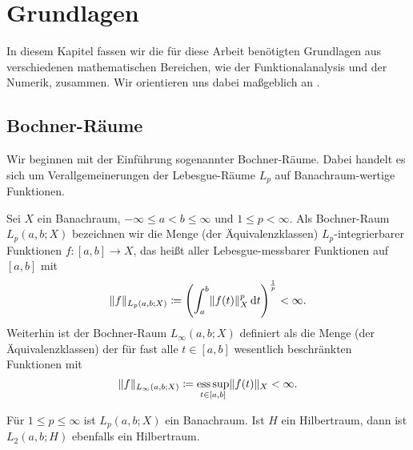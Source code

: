 
\chapter{Grundlagen} %
\label{cha:grundlagen}

In diesem Kapitel fassen wir die für diese Arbeit benötigten Grundlagen aus verschiedenen mathematischen Bereichen, wie der Funktionalanalysis und der Numerik, zusammen.
Wir orientieren uns dabei maßgeblich an \cite{Dautray:1992by}.

\section{Bochner-Räume} %
\label{sec:bochner_r_ume}

Wir beginnen mit der Einführung sogenannter Bochner-Räume.
Dabei handelt es sich um Verallgemeinerungen der Lebesgue-Räume $L_{p}$ auf Banachraum-wertige Funktionen.

\begin{Definition}
\label{definition:gl:bochner_raum}
    Sei $X$ ein Banachraum, $- \infty \leq a < b \leq \infty$ und $1 \leq p < \infty$.
    Als Bochner-Raum $L_{p}(a, b; X)$ bezeichnen wir die Menge (der Äquivalenzklassen) $L_{p}$-integrierbarer Funktionen $f \colon [a, b] \to X$, das heißt aller Lebesgue-messbarer Funktionen auf $[a, b]$ mit
    \begin{equation}
        \lVert f\rVert_{L_{p}(a, b; X)} \coloneqq \left( \int_{a}^{b} \lVert f(t)\rVert_{X}^{p} \mathop{}\!\mathrm{d} t \right)^{\frac{1}{p}} < \infty.
    \end{equation}
    Weiterhin ist der Bochner-Raum $L_{\infty}(a, b; X)$ definiert als die Menge (der Äquivalenzklassen) der für fast alle $t \in [a, b]$ wesentlich beschränkten Funktionen mit
    \begin{equation}
        \lVert f\rVert_{L_{\infty}(a, b; X)} \coloneqq \operatorname*{ess\,sup}_{t \in [a, b]} \lVert f(t)\rVert_{X} < \infty.
    \end{equation}
\end{Definition}

\begin{Lemma}
\label{lemma:gl:bochner_ist_banach}
    Für $1 \leq p \leq \infty$ ist $L_{p}(a, b; X)$ ein Banachraum.
    Ist $H$ ein Hilbertraum, dann ist $L_{2}(a, b; H)$ ebenfalls ein Hilbertraum.
\end{Lemma}


